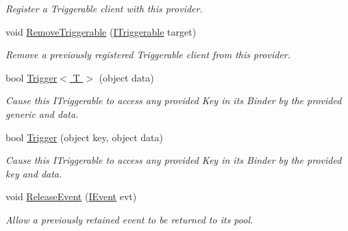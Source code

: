 \begin{DoxyCompactItemize}
\begin{DoxyCompactList}\small\item\em Register a Triggerable client with this provider. \end{DoxyCompactList}\item 
\hypertarget{classstrange_1_1extensions_1_1dispatcher_1_1eventdispatcher_1_1impl_1_1_event_dispatcher_a805d419bf0bad3be1cba8961575e70d7}{void \hyperlink{classstrange_1_1extensions_1_1dispatcher_1_1eventdispatcher_1_1impl_1_1_event_dispatcher_a805d419bf0bad3be1cba8961575e70d7}{Remove\-Triggerable} (\hyperlink{interfacestrange_1_1extensions_1_1dispatcher_1_1api_1_1_i_triggerable}{I\-Triggerable} target)}\label{classstrange_1_1extensions_1_1dispatcher_1_1eventdispatcher_1_1impl_1_1_event_dispatcher_a805d419bf0bad3be1cba8961575e70d7}

\begin{DoxyCompactList}\small\item\em Remove a previously registered Triggerable client from this provider. \end{DoxyCompactList}\item 
bool \hyperlink{classstrange_1_1extensions_1_1dispatcher_1_1eventdispatcher_1_1impl_1_1_event_dispatcher_adc98ad9f12cf02c0e6c68bdc0b73f133}{Trigger$<$ T $>$} (object data)
\begin{DoxyCompactList}\small\item\em Cause this I\-Triggerable to access any provided Key in its Binder by the provided generic and data. \end{DoxyCompactList}\item 
bool \hyperlink{classstrange_1_1extensions_1_1dispatcher_1_1eventdispatcher_1_1impl_1_1_event_dispatcher_a2e3ea9487bb6d0d659e8cb7d47e4e05b}{Trigger} (object key, object data)
\begin{DoxyCompactList}\small\item\em Cause this I\-Triggerable to access any provided Key in its Binder by the provided key and data. \end{DoxyCompactList}\item 
\hypertarget{classstrange_1_1extensions_1_1dispatcher_1_1eventdispatcher_1_1impl_1_1_event_dispatcher_ad92badae76b6061f992564eea11fd4f4}{void \hyperlink{classstrange_1_1extensions_1_1dispatcher_1_1eventdispatcher_1_1impl_1_1_event_dispatcher_ad92badae76b6061f992564eea11fd4f4}{Release\-Event} (\hyperlink{interfacestrange_1_1extensions_1_1dispatcher_1_1eventdispatcher_1_1api_1_1_i_event}{I\-Event} evt)}\label{classstrange_1_1extensions_1_1dispatcher_1_1eventdispatcher_1_1impl_1_1_event_dispatcher_ad92badae76b6061f992564eea11fd4f4}

\begin{DoxyCompactList}\small\item\em Allow a previously retained event to be returned to its pool. \end{DoxyCompactList}\end{DoxyCompactItemize}
